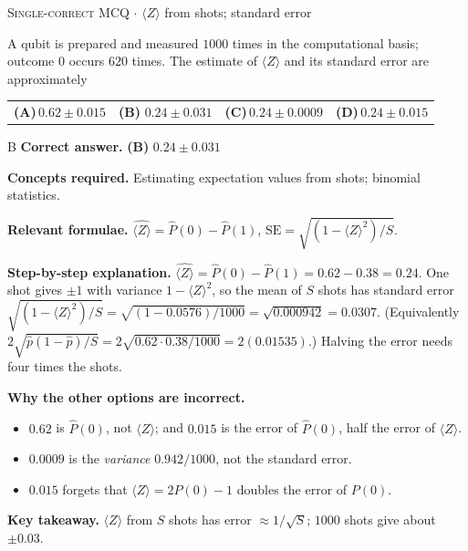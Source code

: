 \documentclass[11pt,a4paper]{article}
\newcommand{\optlabel}[1]{\textbf{(#1)}}
\newcommand{\correctlabel}[1]{\textcolor{okgreen}{\textbf{(#1)}\,\ding{51}}}
\newenvironment{qitem}[1]{\begin{list}{}{\setlength{\leftmargin}{3.3em}\setlength{\labelwidth}{3.1em}%
  \setlength{\labelsep}{0.2em}\setlength{\topsep}{3pt}\setlength{\parsep}{3pt}}\item[\textbf{Q.#1}\hfill]}{\end{list}}
\newcommand{\qsep}{\par\vspace{2pt}{\color{black!15}\hrule}\vspace{4pt}}
\newcommand{\qmeta}[2]{{\footnotesize\color{black!60}\textsc{#1} \;$\cdot$\; #2}\par}
\begin{document}
\begin{qitem}{27}
\qmeta{Single-correct MCQ}{$\langle Z\rangle$ from shots; standard error}
A qubit is prepared and measured $1000$ times in the computational basis; outcome $0$ occurs $620$ times. The
estimate of $\langle Z\rangle$ and its standard error are approximately
\par\smallskip\noindent\begin{tabularx}{\linewidth}{@{}*{4}{L}@{}}
\optlabel{A}\,$0.62 \pm 0.015$ & \correctlabel{B}\,$0.24 \pm 0.031$ & \optlabel{C}\,$0.24 \pm 0.0009$ & \optlabel{D}\,$0.24 \pm 0.015$
\end{tabularx}
\end{qitem}
\begin{solbox}{B}
\textbf{\color{brand}Correct answer.} \textcolor{okgreen}{\textbf{(B)}} $0.24 \pm 0.031$

\textbf{\color{brand}Concepts required.} Estimating expectation values from shots; binomial statistics.

\textbf{\color{brand}Relevant formulae.} $\widehat{\langle Z\rangle} = \hat P(0) - \hat P(1)$, $\mathrm{SE} = \sqrt{(1 - \langle Z\rangle^2)/S}$.

\textbf{\color{brand}Step-by-step explanation.} $\widehat{\langle Z\rangle} = \hat P(0) - \hat P(1) = 0.62 - 0.38 = 0.24$. One shot gives $\pm1$ with variance
$1 - \langle Z\rangle^2$, so the mean of $S$ shots has standard error $\sqrt{(1 - \langle Z\rangle^2)/S} = \sqrt{(1 - 0.0576)/1000}
= \sqrt{0.000942} = 0.0307$. (Equivalently $2\sqrt{\hat p(1-\hat p)/S} = 2\sqrt{0.62\cdot0.38/1000} = 2(0.01535)$.)
Halving the error needs four times the shots.

\textbf{\color{brand}Why the other options are incorrect.}
\begin{itemize}[leftmargin=2.4em, itemsep=1pt, topsep=2pt]
\item[\textbf{(A)}] $0.62$ is $\hat P(0)$, not $\langle Z\rangle$; and $0.015$ is the error of $\hat P(0)$, half the error of $\langle Z\rangle$.
\item[\textbf{(C)}] $0.0009$ is the \emph{variance} $0.942/1000$, not the standard error.
\item[\textbf{(D)}] $0.015$ forgets that $\langle Z\rangle = 2P(0) - 1$ doubles the error of $P(0)$.
\end{itemize}
\textbf{\color{brand}Key takeaway.} $\langle Z\rangle$ from $S$ shots has error $\approx 1/\sqrt S$; $1000$ shots give about $\pm0.03$.
\end{solbox}
\qsep
\end{document}

